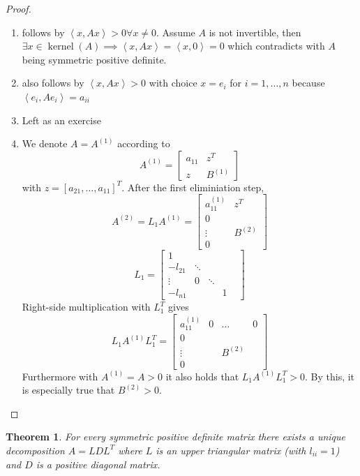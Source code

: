 \documentclass[a4paper]{article}
\newcounter{lecref}[section]
\numberwithin{lecref}{section}
\theoremstyle{break}
\newtheorem{thm}[lecref]{Theorem}
\newcommand{\IP}[2]{\left\langle#1, #2\right\rangle}
\DeclareMathOperator{\ke}{kernel}
\begin{document}
\begin{proof}
  \label{proof-1-6}
  \begin{enumerate}
    \item follows by $\IP{x}{Ax} > 0 \forall x \neq 0$. Assume $A$ is not invertible, then $\exists x \in \ke(A) \implies \IP{x}{Ax} = \IP{x}{0} = 0$ which contradicts with $A$ being symmetric positive definite.
    \item also follows by $\IP{x}{Ax} > 0$ with choice $x = e_i$ for $i = 1, \dots, n$ because $\IP{e_i}{Ae_i} = a_{ii}$
    \item Left as an exercise
    \item We denote $A = A^{(1)}$ according to
      \[
        A^{(1)} = \begin{bmatrix}
          a_{11} & z^T \\
          z & B^{(1)}
        \end{bmatrix}
      \]
      with $z = [a_{21}, \dots, a_{11}]^T$. After the first eliminiation step,
      \[ A^{(2)} = L_1 A^{(1)} = \begin{bmatrix} a_{11}^{(1)} & z^T \\ 0 & \\ \vdots & B^{(2)} \\ 0 & \end{bmatrix} \]
      \[ L_1 = \begin{bmatrix} 1 & & & & \\ -l_{21} & \ddots & & & \\ \vdots & 0 & \ddots & \\ -l_{n1} & & & 1 \end{bmatrix} \]
      Right-side multiplication with $L_1^T$ gives
      \[
        L_1 A^{(1)} L_1^T = \begin{bmatrix}
          a_{11}^{(1)} & 0 & \dots & 0 \\
          0 & & & \\
          \vdots & & B^{(2)} & \\
          0 & & &
        \end{bmatrix}
      \]
      Furthermore with $A^{(1)} = A > 0$ it also holds that $L_1 A^{(1)} L_1^T > 0$.
      By this, it is especially true that $B^{(2)} > 0$.
  \end{enumerate}
\end{proof}

\begin{thm}
  \label{theorem:1-7}
  For every symmetric positive definite matrix there exists a unique decomposition $A = LDL^T$
  where $L$ is an upper triangular matrix (with $l_{ii} = 1$) and $D$ is a positive diagonal matrix.
\end{thm}
\end{document}
